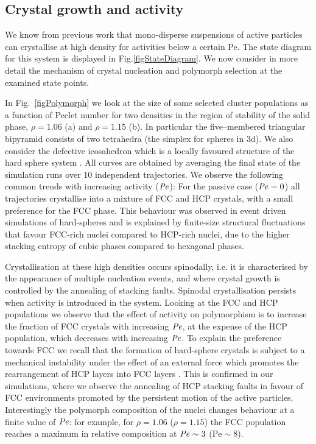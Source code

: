 \subsection{Crystal growth and activity}
\label{sectionCrystalGrowthActivity}



We know from previous work \cite{wysocki2014,omar2021a} that mono-disperse suspensions of active particles can crystallise at high density for activities below a certain Pe. The state diagram for this system is displayed in Fig.\ref{figStateDiagram}. We now consider in more detail the mechanism of crystal nucleation and polymorph selection at the examined state points.


In Fig.~\ref{figPolymorph} we look at the size of some selected cluster populations as a function of Peclet number for two densities in the region of stability of the solid phase, $\rho=1.06$ (a) and $\rho=1.15$ (b). In particular the five--membered triangular bipyramid consists of two tetrahedra (the simplex for spheres in 3d). We also consider the defective icosahedron which is a locally favoured structure of the hard sphere system \cite{royall2015,hallett2018}. All curves are obtained by averaging the final state of the simulation runs over 10 independent trajectories. We observe the following common trends with increasing activity ($\operatorname{\mathit{P\kern-.08em e}}$): For the passive case ($\operatorname{\mathit{P\kern-.08em e}}=0$) all trajectories crystallise into a mixture of FCC and HCP crystals, with a small preference for the FCC phase. This behaviour was observed in event driven simulations of hard-spheres and is explained by finite-size structural fluctuations that favour FCC-rich nuclei compared to HCP-rich nuclei, due to the higher stacking entropy of cubic phases compared to hexagonal phases. 


Crystallisation at these high densities occurs spinodally, i.e. it is characterised by the appearance of multiple nucleation events, and where crystal growth is controlled by the annealing of stacking faults. Spinodal crystallisation persists when activity is introduced in the system. Looking at the FCC and HCP populations we observe that the effect of activity on polymorphism is to increase the fraction of FCC crystals with increasing $\operatorname{\mathit{P\kern-.08em e}}$, at the expense of the HCP population, which decreases with increasing $\operatorname{\mathit{P\kern-.08em e}}$. To explain the preference towards FCC we recall that the formation of hard-sphere crystals is subject to a mechanical instability under the effect of an external force which promotes the rearrangement of HCP layers into FCC layers \cite{heitkam2012}. This is confirmed in our simulations, where we observe the annealing of HCP stacking faults in favour of FCC environments promoted by the persistent motion of the active particles.
Interestingly the polymorph composition of the nuclei changes behaviour at a finite value of $\operatorname{\mathit{P\kern-.08em e}}$: for example, for $\rho=1.06$ ($\rho=1.15$) the FCC population reaches a maximum in relative composition at $\operatorname{\mathit{P\kern-.08em e}}\sim 3$ ($\text{Pe}\sim 8$).


